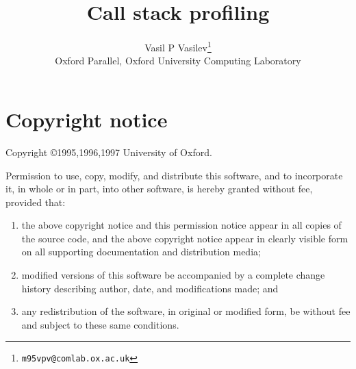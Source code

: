 \documentclass[12pt]{report}
\begin{document}
\title{Call stack profiling}
\author{Vasil P Vasilev\footnote{\texttt{m95vpv@comlab.ox.ac.uk}}\\
        Oxford Parallel, Oxford University Computing Laboratory}
\maketitle

\tableofcontents

\chapter*{Copyright notice}
\centerline{Copyright \copyright 1995,1996,1997 University of Oxford.}
\vspace{2ex}

\noindent Permission to use, copy, modify, and distribute this
software, and to incorporate it, in whole or in part, into other
software, is hereby granted without fee, provided that:
\begin{enumerate}
\item the above copyright notice and this permission notice appear in
all copies of the source code, and the above copyright notice appear
in clearly visible form on all supporting documentation and
distribution media;

\item modified versions of this software be accompanied by a complete
change history describing author, date, and modifications made; and 

\item any redistribution of the software, in original or modified form, be without fee and subject to these same conditions.
\end{enumerate}
\clearpage

	
	



\end{document}
